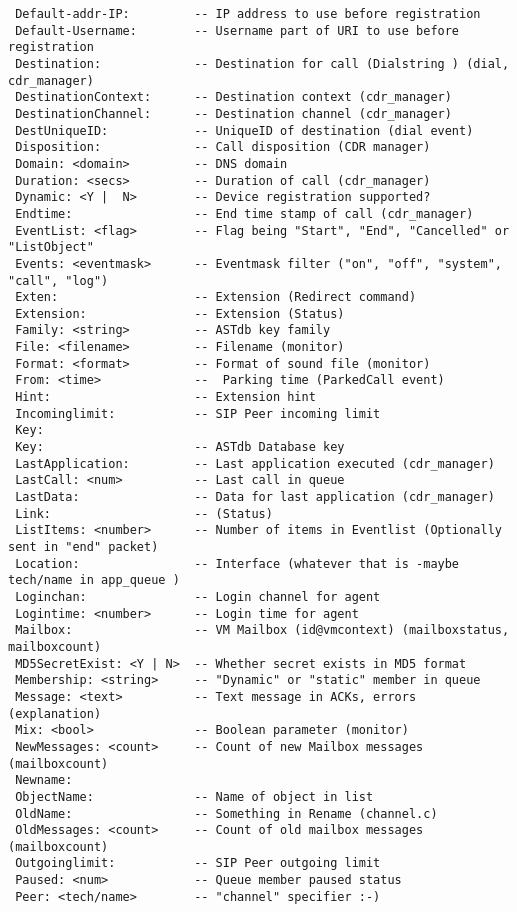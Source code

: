 \begin{verbatim}
 Default-addr-IP:         -- IP address to use before registration
 Default-Username:        -- Username part of URI to use before registration
 Destination:             -- Destination for call (Dialstring ) (dial, cdr_manager)
 DestinationContext:      -- Destination context (cdr_manager)
 DestinationChannel:      -- Destination channel (cdr_manager)
 DestUniqueID:            -- UniqueID of destination (dial event)
 Disposition:             -- Call disposition (CDR manager)
 Domain: <domain>         -- DNS domain
 Duration: <secs>         -- Duration of call (cdr_manager)
 Dynamic: <Y |  N>        -- Device registration supported?
 Endtime:                 -- End time stamp of call (cdr_manager)
 EventList: <flag>        -- Flag being "Start", "End", "Cancelled" or "ListObject"
 Events: <eventmask>      -- Eventmask filter ("on", "off", "system", "call", "log")
 Exten:                   -- Extension (Redirect command)
 Extension:               -- Extension (Status)
 Family: <string>         -- ASTdb key family
 File: <filename>         -- Filename (monitor)
 Format: <format>         -- Format of sound file (monitor)
 From: <time>             --  Parking time (ParkedCall event)
 Hint:                    -- Extension hint
 Incominglimit:           -- SIP Peer incoming limit
 Key:
 Key:                     -- ASTdb Database key
 LastApplication:         -- Last application executed (cdr_manager)
 LastCall: <num>          -- Last call in queue
 LastData:                -- Data for last application (cdr_manager)
 Link:                    -- (Status)
 ListItems: <number>      -- Number of items in Eventlist (Optionally sent in "end" packet)
 Location:                -- Interface (whatever that is -maybe tech/name in app_queue )
 Loginchan:               -- Login channel for agent
 Logintime: <number>      -- Login time for agent
 Mailbox:                 -- VM Mailbox (id@vmcontext) (mailboxstatus, mailboxcount)
 MD5SecretExist: <Y | N>  -- Whether secret exists in MD5 format
 Membership: <string>     -- "Dynamic" or "static" member in queue
 Message: <text>          -- Text message in ACKs, errors (explanation)
 Mix: <bool>              -- Boolean parameter (monitor)
 NewMessages: <count>     -- Count of new Mailbox messages (mailboxcount)
 Newname:
 ObjectName:              -- Name of object in list
 OldName:                 -- Something in Rename (channel.c)
 OldMessages: <count>     -- Count of old mailbox messages (mailboxcount)
 Outgoinglimit:           -- SIP Peer outgoing limit
 Paused: <num>            -- Queue member paused status
 Peer: <tech/name>        -- "channel" specifier :-)

\end{verbatim}
